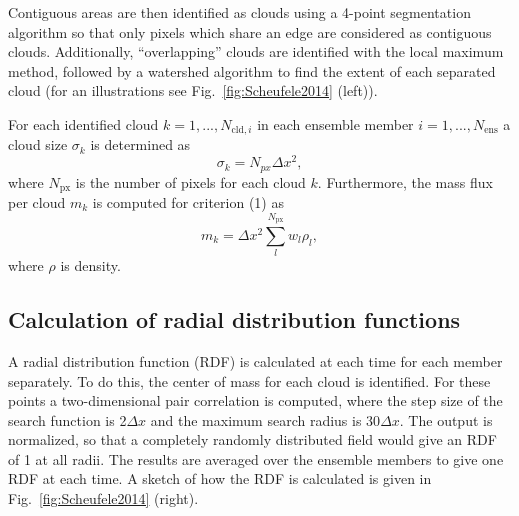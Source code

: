 \documentclass[a4paper, 12pt]{article}
\begin{document}

Contiguous areas are then identified as clouds using a 4-point segmentation algorithm so that only pixels which share an edge are considered as contiguous clouds. Additionally, ``overlapping'' clouds are identified with the local maximum method, followed by a watershed algorithm to find the extent of each separated cloud (for an illustrations see Fig.~\ref{fig:Scheufele2014} (left)).

For each identified cloud $k=1,...,N_{\mathrm{cld},i}$ in each ensemble member $i=1,...,N_{\mathrm{ens}}$ a cloud size $\sigma_k$ is determined as
\begin{equation} \label{eq:cld_size}
 \sigma_k = N_{px} \Delta x^2,
\end{equation}
where $N_{\mathrm{px}}$ is the number of pixels for each cloud $k$. Furthermore, the mass flux per cloud $m_k$ is computed for criterion (1) as
\begin{equation} \label{eq:mass_flux_per_cloud}
 m_k = \Delta x^2 \sum_{l}^{N_{\mathrm{px}}} w_l \rho_l,
\end{equation}
where $\rho$ is density.

\subsection{Calculation of radial distribution functions}
A radial distribution function (RDF) is calculated at each time for each member separately. To do this, the center of mass for each cloud is identified. For these points a two-dimensional pair correlation is computed, where the step size of the search function is 2$\Delta x$ and the maximum search radius is 30$\Delta x$. The output is normalized, so that a completely randomly distributed field would give an RDF of 1 at all radii. The results are averaged over the ensemble members to give one RDF at each time. A sketch of how the RDF is calculated is given in Fig.~\ref{fig:Scheufele2014} (right).
\end{document}
